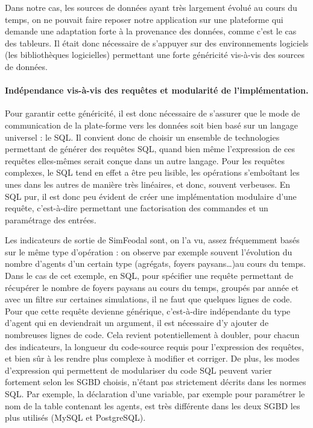 Dans notre cas, les sources de données ayant très largement évolué au cours du temps, on ne pouvait faire reposer notre application sur une plateforme qui demande une adaptation forte à la provenance des données, comme c'est le cas des tableurs.
Il était donc nécessaire de s'appuyer sur des environnements logiciels (les bibliothèques logicielles) permettant une forte généricité vis-à-vis des sources de données.

\paragraph{Indépendance vis-à-vis des requêtes et modularité de l'implémentation. \label{par:DSL}}

Pour garantir cette généricité, il est donc nécessaire de s'assurer que le mode de communication de la plate-forme vers les données soit bien basé sur un langage universel : le SQL.
Il convient donc de choisir un ensemble de technologies permettant de générer des requêtes SQL, quand bien même l'expression de ces requêtes elles-mêmes serait conçue dans un autre langage.
Pour les requêtes complexes, le SQL tend en effet a être peu lisible, les opérations s'emboîtant les unes dans les autres de manière très linéaires, et donc, souvent verbeuses.
En SQL pur, il est donc peu évident de créer une implémentation modulaire d'une requête, c'est-à-dire permettant une factorisation des commandes et un paramétrage des entrées.

Les indicateurs de sortie de SimFeodal sont, on l'a vu, assez fréquemment basés sur le même type d'opération : on observe par exemple souvent l'évolution du nombre d'agents d'un certain type (agrégats, foyers paysans\ldots)au cours du temps.
Dans le cas de cet exemple, en SQL, pour spécifier une requête permettant de récupérer le nombre de foyers paysans au cours du temps, groupés par année et avec un filtre sur certaines simulations, il ne faut que quelques lignes de code.
Pour que cette requête devienne générique, c'est-à-dire indépendante du type d'agent qui en deviendrait un argument,  il est nécessaire d'y ajouter de nombreuses lignes de code.
Cela revient potentiellement à doubler, pour chacun des indicateurs, la longueur du code-source requis pour l'expression des requêtes, et bien sûr à les rendre plus complexe à modifier et corriger.
De plus, les modes d'expression qui permettent de modulariser du code SQL peuvent varier fortement selon les SGBD choisis, n'étant pas strictement décrits dans les normes SQL.
Par exemple, la déclaration d'une variable, par exemple pour paramétrer le nom de la table contenant les agents, est très différente dans les deux SGBD les plus utilisés (MySQL et PostgreSQL).

